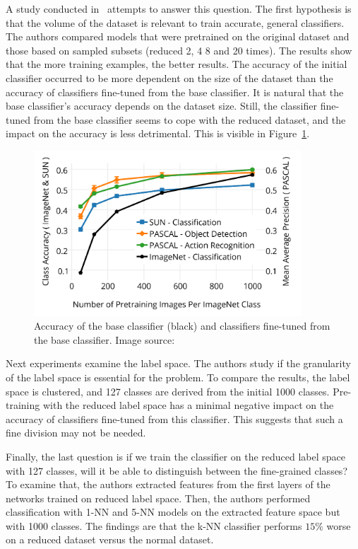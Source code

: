 \documentclass[a4paper,11pt,twoside]{report}
\theoremstyle{definition}
\begin{document}
\FloatBarrier

A study conducted in~\cite{imagnet} attempts to answer this question. The first hypothesis is that the volume of the dataset is relevant to train accurate, general classifiers. The authors compared models that were pretrained on the original dataset and those based on sampled subsets (reduced 2, 4 8 and 20 times). The results show that the more training examples, the better results. The accuracy of the initial classifier occurred to be more dependent on the size of the dataset than the accuracy of classifiers fine-tuned from the base classifier. It is natural that the base classifier's accuracy depends on the dataset size. Still, the classifier fine-tuned from the base classifier seems to cope with the reduced dataset, and the impact on the accuracy is less detrimental. This is visible in Figure~\ref{fig:size_acc_img}.

\FloatBarrier


\begin{figure}[h!]
\centering
\includegraphics[width=10cm]{imgs/imagenet_instances_accuracy.png}
\caption{Accuracy of the base classifier (black) and classifiers fine-tuned from the base classifier. Image source:~\cite{imagnet}}
\label{fig:size_acc_img}
\end{figure}
\FloatBarrier

Next experiments examine the label space. The authors study if the granularity of the label space is essential for the problem. To compare the results, the label space is clustered, and 127 classes are derived from the initial 1000 classes. Pre-training with the reduced label space has a minimal negative impact on the accuracy of classifiers fine-tuned from this classifier. This suggests that such a fine division may not be needed.

Finally, the last question is if we train the classifier on the reduced label space with 127 classes, will it be able to distinguish between the fine-grained classes? To examine that, the authors extracted features from the first layers of the networks trained on reduced label space. Then, the authors performed classification with 1-NN and 5-NN models on the extracted feature space but with 1000 classes. The findings are that the k-NN classifier performs $15\%$ worse on a reduced dataset versus the normal dataset.
\end{document}

